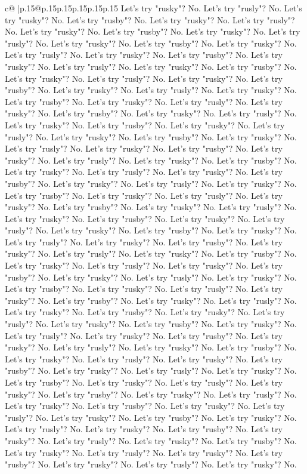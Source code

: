 \documentclass{article}
\begin{document}
{\begin{supertabular}{c@{$\;$}|p{.15\linewidth}@{}p{.15\linewidth}p{.15\linewidth}p{.15\linewidth}p{.15\linewidth}p{.15\linewidth}}
{{{Let's try "rusky"? No. Let's try "rusly"? No. Let's try "rusky"? No. Let's try "rusby"? No. Let's try "rusky"? No. Let's try "rusly"? No. Let's try "rusky"? No. Let's try "rusby"? No. Let's try "rusky"? No. Let's try "rusly"? No. Let's try "rusky"? No. Let's try "rusby"? No. Let's try "rusky"? No. Let's try "rusly"? No. Let's try "rusky"? No. Let's try "rusby"? No. Let's try "rusky"? No. Let's try "rusly"? No. Let's try "rusky"? No. Let's try "rusby"? No. Let's try "rusky"? No. Let's try "rusly"? No. Let's try "rusky"? No. Let's try "rusby"? No. Let's try "rusky"? No. Let's try "rusly"? No. Let's try "rusky"? No. Let's try "rusby"? No. Let's try "rusky"? No. Let's try "rusly"? No. Let's try "rusky"? No. Let's try "rusby"? No. Let's try "rusky"? No. Let's try "rusly"? No. Let's try "rusky"? No. Let's try "rusby"? No. Let's try "rusky"? No. Let's try "rusly"? No. Let's try "rusky"? No. Let's try "rusby"? No. Let's try "rusky"? No. Let's try "rusly"? No. Let's try "rusky"? No. Let's try "rusby"? No. Let's try "rusky"? No. Let's try "rusly"? No. Let's try "rusky"? No. Let's try "rusby"? No. Let's try "rusky"? No. Let's try "rusly"? No. Let's try "rusky"? No. Let's try "rusby"? No. Let's try "rusky"? No. Let's try "rusly"? No. Let's try "rusky"? No. Let's try "rusby"? No. Let's try "rusky"? No. Let's try "rusly"? No. Let's try "rusky"? No. Let's try "rusby"? No. Let's try "rusky"? No. Let's try "rusly"? No. Let's try "rusky"? No. Let's try "rusby"? No. Let's try "rusky"? No. Let's try "rusly"? No. Let's try "rusky"? No. Let's try "rusby"? No. Let's try "rusky"? No. Let's try "rusly"? No. Let's try "rusky"? No. Let's try "rusby"? No. Let's try "rusky"? No. Let's try "rusly"? No. Let's try "rusky"? No. Let's try "rusby"? No. Let's try "rusky"? No. Let's try "rusly"? No. Let's try "rusky"? No. Let's try "rusby"? No. Let's try "rusky"? No. Let's try "rusly"? No. Let's try "rusky"? No. Let's try "rusby"? No. Let's try "rusky"? No. Let's try "rusly"? No. Let's try "rusky"? No. Let's try "rusby"? No. Let's try "rusky"? No. Let's try "rusly"? No. Let's try "rusky"? No. Let's try "rusby"? No. Let's try "rusky"? No. Let's try "rusly"? No. Let's try "rusky"? No. Let's try "rusby"? No. Let's try "rusky"? No. Let's try "rusly"? No. Let's try "rusky"? No. Let's try "rusby"? No. Let's try "rusky"? No. Let's try "rusly"? No. Let's try "rusky"? No. Let's try "rusby"? No. Let's try "rusky"? No. Let's try "rusly"? No. Let's try "rusky"? No. Let's try "rusby"? No. Let's try "rusky"? No. Let's try "rusly"? No. Let's try "rusky"? No. Let's try "rusby"? No. Let's try "rusky"? No. Let's try "rusly"? No. Let's try "rusky"? No. Let's try "rusby"? No. Let's try "rusky"? No. Let's try "rusly"? No. Let's try "rusky"? No. Let's try "rusby"? No. Let's try "rusky"? No. Let's try "rusly"? No. Let's try "rusky"? No. Let's try "rusby"? No. Let's try "rusky"? No. Let's try "rusly"? No. Let's try "rusky"? No. Let's try "rusby"? No. Let's try "rusky"? No. Let's try "rusly"? No. Let's try "rusky"? No. Let's try "rusby"? No. Let's try "rusky"? No. Let's try "rusly"? No. Let's try "rusky"? No. Let's try "rusby"? No. Let's try "rusky"? No. Let's try "rusly"? No. Let's try "rusky"? No. }}}
\end{supertabular}}
\end{document}
